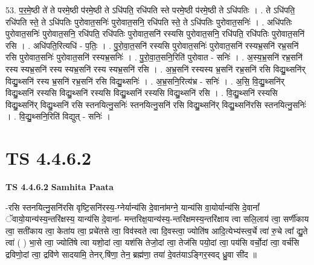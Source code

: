 \documentclass[17pt]{extarticle}
\begin{document}
53. प॒र॒मे॒ष्ठी ते॑ ते परमे॒ष्ठी प॑रमे॒ष्ठी ते ऽधि॑पति॒ रधि॑पति स्ते परमे॒ष्ठी प॑रमे॒ष्ठी ते ऽधि॑पतिः । . ते ऽधि॑पति॒ रधि॑पति स्ते॒ ते ऽधि॑पतिः पुरोवात॒सनिः॑ पुरोवात॒सनि॒ रधि॑पति स्ते॒ ते ऽधि॑पतिः पुरोवात॒सनिः॑ । . अधि॑पतिः पुरोवात॒सनिः॑ पुरोवात॒सनि॒ रधि॑पति॒ रधि॑पतिः पुरोवात॒सनि॑ रस्यसि पुरोवात॒सनि॒ रधि॑पति॒ रधि॑पतिः पुरोवात॒सनि॑ रसि । . अधि॑पति॒रित्यधि॑ - प॒तिः॒ । . पु॒रो॒वा॒त॒सनि॑ रस्यसि पुरोवात॒सनिः॑ पुरोवात॒सनि॑ रस्यभ्र॒सनि॑ रभ्र॒सनि॑ रसि पुरोवात॒सनिः॑ पुरोवात॒सनि॑ रस्यभ्र॒सनिः॑ । . पु॒रो॒वा॒त॒सनि॒रिति॑ पुरोवात - सनिः॑ । . अ॒स्य॒भ्र॒सनि॑ रभ्र॒सनि॑ रस्य स्यभ्र॒सनि॑ रस्य स्यभ्र॒सनि॑ रस्य स्यभ्र॒सनि॑ रसि । . अ॒भ्र॒सनि॑ रस्यस्य भ्र॒सनि॑ रभ्र॒सनि॑ रसि विद्यु॒थ्सनि॑र् विद्यु॒थ्सनि॑ रस्य भ्र॒सनि॑ रभ्र॒सनि॑ रसि विद्यु॒थ्सनिः॑ । . अ॒भ्र॒सनि॒रित्य॑भ्र - सनिः॑ । . अ॒सि॒ वि॒द्यु॒थ्सनि॑र् विद्यु॒थ्सनि॑ रस्यसि विद्यु॒थ्सनि॑ रस्यसि विद्यु॒थ्सनि॑ रस्यसि विद्यु॒थ्सनि॑ रसि । . वि॒द्यु॒थ्सनि॑ रस्यसि विद्यु॒थ्सनि॑र् विद्यु॒थ्सनि॑ रसि स्तनयित्नु॒सनिः॑ स्तनयित्नु॒सनि॑ रसि विद्यु॒थ्सनि॑र् विद्यु॒थ्सनि॑रसि स्तनयित्नु॒सनिः॑ । . वि॒द्यु॒थ्सनि॒रिति॑ विद्युत् - सनिः॑ । \newline
\pagebreak
{}

\section{ TS 4.4.6.2 }

\textbf{TS 4.4.6.2 } \newline
\textbf{Samhita Paata} \newline

-रसि स्तनयित्नु॒सनि॑रसि वृष्टि॒सनि॑रस्य॒-ग्नेर्यान्य॑सि दे॒वाना॑मग्ने॒ यान्य॑सि वा॒योर्यान्य॑सि दे॒वानां᳚ ॅवायो॒यान्य॑स्य॒न्तरि॑क्षस्य॒ यान्य॑सि दे॒वाना॑- मन्तरिक्ष॒यान्य॑स्य॒-न्तरि॑क्षमस्य॒न्तरि॑क्षाय त्वा सलि॒लाय॑ त्वा॒ सर्णी॑काय त्वा॒ सती॑काय त्वा॒ केता॑य त्वा॒ प्रचे॑तसे त्वा॒ विव॑स्वते त्वा दि॒वस्त्वा॒ ज्योति॑ष आदि॒त्येभ्य॑स्त्व॒र्चे त्वा॑ रु॒चे त्वा᳚ द्यु॒ते त्वा॑ ( ) भा॒से त्वा॒ ज्योति॑षे त्वा यशो॒दां त्वा॒ यश॑सि तेजो॒दां त्वा॒ तेज॑सि पयो॒दां त्वा॒ पय॑सि वर्चो॒दां त्वा॒ वर्च॑सि द्रविणो॒दां त्वा॒ द्रवि॑णे सादयामि॒ तेनर्.षि॑णा॒ तेन॒ ब्रह्म॑णा॒ तया॑ दे॒वत॑याऽङ्गिर॒स्वद् ध्रु॒वा सी॑द ॥ \newline
\end{document}
